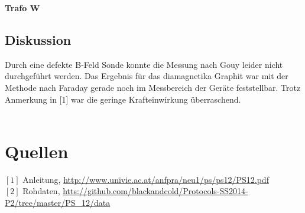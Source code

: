 \documentclass[12pt,a4paper]{article}
\begin{document}
\begin{multicols}{2}
\noindent
\textbf{Trafo W}\\

\subsection{Diskussion}
Durch eine defekte B-Feld Sonde konnte die Messung nach Gouy leider nicht durchgeführt werden. Das Ergebnis für das diamagnetika Graphit war mit der Methode nach Faraday gerade noch im Messbereich der Geräte feststellbar. Trotz Anmerkung in [1] war die geringe Krafteinwirkung überraschend.\\
\\



\section{Quellen}
$[1]$ Anleitung, \url{http://www.univie.ac.at/anfpra/neu1/ps/ps12/PS12.pdf}\\
$[2]$ Rohdaten, \url{htts://github.com/blackandcold/Protocols-SS2014-P2/tree/master/PS_12/data}\\

\end{multicols}
\end{document}
